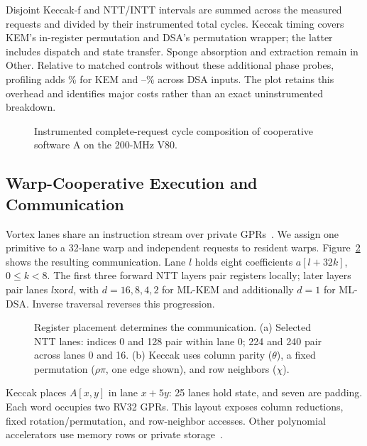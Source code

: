 \documentclass[conference,letterpaper]{IEEEtran}
\begin{document}
Disjoint Keccak-f and NTT/INTT intervals are summed across the measured
requests and divided by their instrumented total cycles. Keccak timing
covers KEM's in-register permutation and DSA's permutation wrapper; the
latter includes dispatch and state transfer. Sponge absorption and extraction
remain in Other. Relative to matched controls without these additional phase
probes, profiling adds \MotivationKemOverheadMax{}\% for KEM and
\MotivationDsaOverheadMin{}--\MotivationDsaOverheadMax{}\% across DSA inputs.
The plot retains this overhead and identifies major costs rather than an
exact uninstrumented breakdown.

\begin{figure}[t]
\centering
\caption{Instrumented complete-request cycle composition of cooperative
software A on the 200-MHz V80.}
\label{fig:motivation}
\end{figure}

\subsection{Warp-Cooperative Execution and Communication}
\label{sec:software-mapping}
Vortex lanes share an instruction stream over private GPRs~\cite{vortex}.
We assign one primitive to a 32-lane warp and independent requests to
resident warps. Figure~\ref{fig:thesis} shows the resulting communication.
Lane $l$ holds eight coefficients $a[l+32k]$, $0\le k<8$. The first three
forward NTT layers pair registers locally; later layers pair lanes
$l\mathbin{\mathrm{xor}}d$, with $d=16,8,4,2$ for ML-KEM and additionally
$d=1$ for ML-DSA. Inverse traversal reverses this progression.

\begin{figure}[t]
\centering
\par\vspace{1.5mm}
\caption{Register placement determines the communication. (a) Selected NTT
lanes: indices 0 and 128 pair within lane 0; 224 and 240 pair across lanes 0
and 16. (b) Keccak uses column parity ($\theta$), a fixed permutation
($\rho\pi$, one edge shown), and row neighbors ($\chi$).}
\label{fig:thesis}
\end{figure}

Keccak places $A[x,y]$ in lane $x+5y$: 25 lanes hold state, and seven are
padding. Each word occupies two RV32 GPRs. This layout exposes column
reductions, fixed rotation/permutation, and row-neighbor accesses. Other
polynomial accelerators use memory rows or private storage~\cite{nttpim,bpntt,cham,zkflex}.
\end{document}
